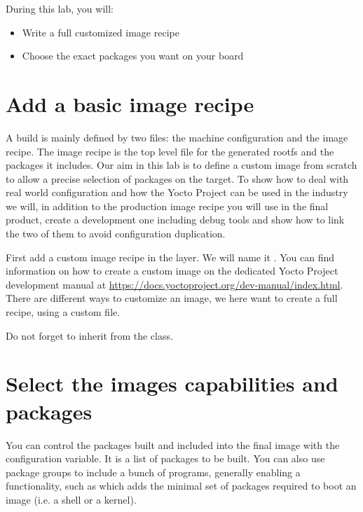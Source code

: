 
During this lab, you will:
\begin{itemize}
  \item Write a full customized image recipe
  \item Choose the exact packages you want on your board
\end{itemize}

\section{Add a basic image recipe}

A build is mainly defined by two files: the machine configuration and the image
recipe. The image recipe is the top level file for the generated rootfs and
the packages it includes. Our aim in this lab is to define a custom image from
scratch to allow a precise selection of packages on the target. To
show how to deal with real world configuration and how the Yocto Project can be
used in the industry we will, in addition to the production image recipe you
will use in the final product, create a development one including debug tools
and show how to link the two of them to avoid configuration duplication.

First add a custom image recipe in the  layer. We will name it
. You can find information on how to create a custom
image on the dedicated Yocto Project development manual at
\url{https://docs.yoctoproject.org/dev-manual/index.html}. There
are different ways to customize an image, we here want to create a full recipe,
using a custom  file.

Do not forget to inherit from the  class.

\section{Select the images capabilities and packages}

You can control the packages built and included into the final image with the
 configuration variable. It is a list of packages to be
built. You can also use package groups to include a bunch of programs, generally
enabling a functionality, such as  which adds the
minimal set of packages required to boot an image (i.e. a shell or a kernel).

